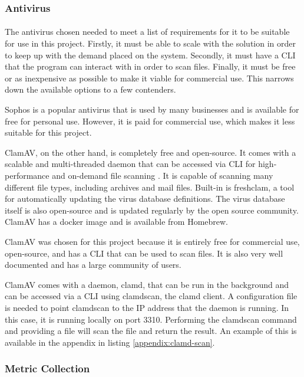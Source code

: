 \documentclass[12pt, conference, final, a4paper, onecolumn, compsoc]{IEEEtran}
\begin{document}
\subsubsection*{Antivirus}
\paragraph{}

The antivirus chosen needed to meet a list of requirements for it to be suitable
for use in this project. Firstly, it must be able to scale with the solution in
order to keep up with the demand placed on the system. Secondly, it must have a
CLI that the program can interact with in order to scan files. Finally, it must
be free or as inexpensive as possible to make it viable for commercial use. This
narrows down the available options to a few contenders.

Sophos is a popular antivirus that is used by many businesses and is available
for free for personal use. However, it is paid for commercial use, which makes
it less suitable for this project.

ClamAV, on the other hand, is completely free and open-source. It comes with a
scalable and multi-threaded daemon that can be accessed via CLI for
high-performance and on-demand file scanning \citep{clamav}. It is capable of
scanning many different file types, including archives and mail files. Built-in
is freshclam, a tool for automatically updating the virus database definitions.
The virus database itself is also open-source and is updated regularly by the
open source community. ClamAV has a docker image and is available from Homebrew.

ClamAV was chosen for this project because it is entirely free for commercial
use, open-source, and has a CLI that can be used to scan files. It is also very
well documented and has a large community of users.

ClamAV comes with a daemon, clamd, that can be run in the background and can be
accessed via a CLI using clamdscan, the clamd client. A configuration file is
needed to point clamdscan to the IP address that the daemon is running. In this
case, it is running locally on port 3310. Performing the clamdscan command and
providing a file will scan the file and return the result. An example of this is
available in the appendix in listing \ref{appendix:clamd-scan}.


\subsubsection*{Metric Collection}
\end{document}

